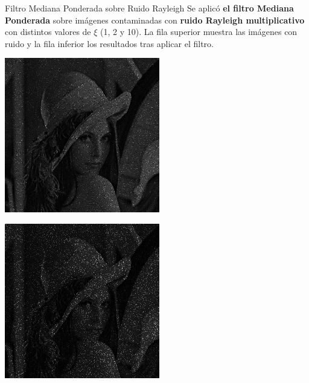 \documentclass{beamer}
\begin{document}
\begin{frame}[fragile]{Filtro Mediana Ponderada sobre Ruido Rayleigh}
	\justifying
	\footnotesize
	Se aplicó \textcolor{unahurverde}{\textbf{el filtro Mediana Ponderada}} sobre imágenes contaminadas con \textcolor{unahurverde}{\textbf{ruido Rayleigh multiplicativo}}  
	con distintos valores de $\xi$ (1, 2 y 10).  
	La fila superior muestra las imágenes con ruido y la fila inferior los resultados tras aplicar el filtro.
	
	\centering
	\begin{minipage}{0.25\linewidth}
		\centering
		\includegraphics[width=\linewidth]{../results/lena_rayleigh_xi1}
	\end{minipage}\hfill
	\begin{minipage}{0.25\linewidth}
		\centering
		\includegraphics[width=\linewidth]{../results/lena_rayleigh_xi2}

\end{minipage}
\end{frame}
\end{document}
